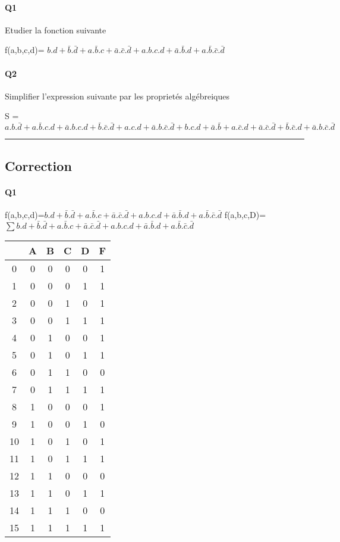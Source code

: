 \paragraph{Q1}

Etudier la fonction suivante

f(a,b,c,d)= $b.d+\bar b.\bar d+a.\bar b.c+\bar a.\bar c.\bar d + a.b.c.d+\bar a.\bar b.d+a.\bar b.\bar c.\bar d$

\paragraph{Q2}

Simplifier l'expression suivante par les proprietés algébreiques 

S = $a.b.\bar d+a.\bar b.c.d+\bar a.b.c.d+\bar b.\bar c.\bar d + a.c.d+\bar a.b.\bar c.\bar d + b.c.d+\bar a.\bar b+a.\bar c.d+\bar a.\bar c.\bar d + \bar b.\bar c.d+\bar a.b.\bar c.\bar d$

\hrule width 1\linewidth\pagebreak
\subsection{Correction}

\paragraph{Q1}

f(a,b,c,d)=$b.d+\bar b.\bar d+a.\bar b.c+\bar a.\bar c.\bar d + a.b.c.d+\bar a.\bar b.d+a.\bar b.\bar c.\bar d$
f(a,b,c,D)=$ \sum b.d+\bar b.\bar d+a.\bar b.c+\bar a.\bar c.\bar d + a.b.c.d+\bar a.\bar b.d+a.\bar b.\bar c.\bar d $ 

        \begin{tabular}{|c|c|c|c|c||c|}
    \toprule
         & A & B & C & D & F\\ \midrule0 & 0 & 0 & 0 & 0 & 1\\1 & 0 & 0 & 0 & 1 & 1\\2 & 0 & 0 & 1 & 0 & 1\\3 & 0 & 0 & 1 & 1 & 1\\\midrule4 & 0 & 1 & 0 & 0 & 1\\5 & 0 & 1 & 0 & 1 & 1\\6 & 0 & 1 & 1 & 0 & 0\\7 & 0 & 1 & 1 & 1 & 1\\\midrule8 & 1 & 0 & 0 & 0 & 1\\9 & 1 & 0 & 0 & 1 & 0\\10 & 1 & 0 & 1 & 0 & 1\\11 & 1 & 0 & 1 & 1 & 1\\\midrule12 & 1 & 1 & 0 & 0 & 0\\13 & 1 & 1 & 0 & 1 & 1\\14 & 1 & 1 & 1 & 0 & 0\\15 & 1 & 1 & 1 & 1 & 1\\\bottomrule
        \end{tabular}
        
